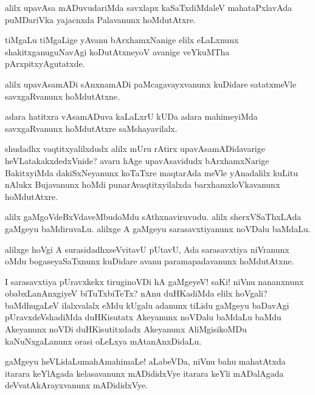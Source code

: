 \begin{mng}
alilx upavAsa mADuvudariMda savxlapx kaSaTxdiMdaleV mahataPxlavAda puMDariVka yajacnxda Palavanunx hoMdutAtxre.
\end{mng}

\begin{mng}
tiMgaLu tiMgaLige yAvanu bArxhamxNanige elilx eLaLxnunx shakitxganuguNavAgi koDutAtxneyoV avanige veYkuMTha pArxpitxyAgutatxde.
\end{mng}

\begin{mng}
alilx upavAsamADi sAnxnamADi paMcagavayxvanunx kuDidare satatxmeVle savxgaRvanunx hoMdutAtxne.
\end{mng}

\begin{mng}
adara hatitxra vAsamADuva kaLaLxrU kUDa adara mahimeyiMda savxgaRvanunx hoMdutAtxre saMshayavilalx.
\end{mng}

\begin{mng}
shudadhx vaqtitxyalilxdudx alilx mUru rAtirx upavAsamADidavarige heVLatakakxdedxVnide? avaru hAge upavAsavidudx bArxhamxNarige BakitxyiMda dakiSxNeyanunx koTaTxre maqtarAda meVle yAnadalilx kuLitu nAlukx Bujavanunx hoMdi punarAvaqtitxyilalxda barxhamxloVkavanunx hoMdutAtxre.
\end{mng}

\begin{mng}
alilx gaMgoVdeBxVdaveMbudoMdu sAthxnaviruvudu. alilx sherxVSaThxLAda gaMgeyu baMdiruvaLu. alilxge A gaMgeyu sarasavxtiyanunx noVDalu baMdaLu.
\end{mng}

\begin{mng}
alilxge hoVgi A surasidadhxseVvitavU pUtavU, Ada sarasavxtiya niVranunx oMdu bogaseyaSaTxnunx kuDidare avanu paramapadavanunx hoMdutAtxne.
\end{mng}

\begin{mng}
I sarasavxtiya pUravxkekx tiruginoVDi hA gaMgeyeV! saKi! niVnu nananxnunx obabxLanAnxgiyeV biTuTxbiTeTx? nAnu duHKadiMda elilx hoVgali? baMdhugaLeV ilalxvalalx eMdu kUgalu adanunx tiLidu gaMgeyu baDavAgi pUravxdeVshadiMda duHKisutatx Akeyanunx noVDalu baMdaLu baMdu Akeyanunx noVDi duHKisutitxdadx Akeyanunx AliMgisikoMDu kaNuNxgaLanunx orasi oLeLxya mAtanAnxDidaLu.
\end{mng}

\begin{mng}
gaMgeyu heVLidaLu\mdash mahAmahimaLe! aLabeVDa, niVnu bahu mahatAtxda itarara keYlAgada kelasavanunx mADididxVye itarara keYli mADalAgada deVvatAkArayxvanunx mADididxVye.
\end{mng}

